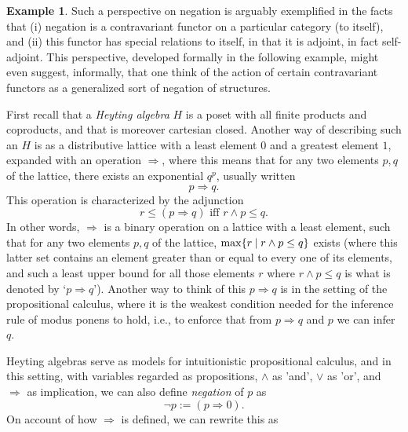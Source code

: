 \documentclass[11pt]{book}
\theoremstyle{definition}
\newtheorem{example}{Example}[section]
\theoremstyle{definition}
\theoremstyle{definition}
\theoremstyle{theorem}
\theoremstyle{definition}
\begin{document}
\begin{example}
	Such a perspective on negation is arguably exemplified in the facts that (i) negation is a contravariant functor on a particular category (to itself), and (ii) this functor has special relations to itself, in that it is adjoint, in fact self-adjoint. This perspective, developed formally in the following example, might even suggest, informally, that one think of the action of certain contravariant functors as a generalized sort of negation of structures. \par 
	First recall that a \textit{Heyting algebra} $H$ is a poset with all finite products and coproducts, and that is moreover cartesian closed. Another way of describing such an $H$ is as a distributive lattice with a least element $0$ and a greatest element $1$, expanded with an operation $\Rightarrow$, where this means that for any two elements $p, q$ of the lattice, there exists an exponential $q^p$, usually written 
	\begin{equation*}
	p \Rightarrow q.
	\end{equation*}
	This operation is characterized by the adjunction  
	\begin{equation*}
	r \leq (p \Rightarrow q) \text{ iff } r \wedge p \leq q. 
	\end{equation*}	  
	In other words, $\Rightarrow$ is a binary operation on a lattice with a least element, such that for any two elements $p, q$ of the lattice, $\max \{r \hspace*{0.25em}| \hspace*{0.25em} r \wedge p \leq q \}$ exists (where this latter set contains an element greater than or equal to every one of its elements, and such a least upper bound for all those elements $r$ where $r \wedge p \leq q$ is what is denoted by `$p \Rightarrow q$'). Another way to think of this $p \Rightarrow q$ is in the setting of the propositional calculus, where it is the weakest condition needed for the inference rule of modus ponens to hold, i.e., to enforce that from $p \Rightarrow q$ and $p$ we can infer $q$.\par 
	Heyting algebras serve as models for intuitionistic propositional calculus, and in this setting, with variables regarded as propositions, $\wedge$ as 'and', $\vee$ as 'or', and $\Rightarrow$ as implication, we can also define \textit{negation} of $p$ as 
	\begin{equation*}
	\neg p := (p \Rightarrow 0). 
	\end{equation*}  
	On account of how $\Rightarrow$ is defined, we can rewrite this as 

\end{example}
\end{document}
